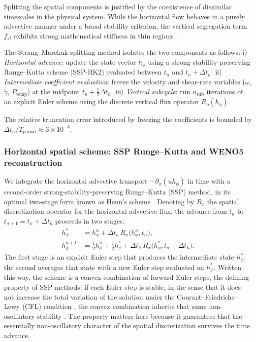 \documentclass[lineno]{JFM-FLM_Au}
\begin{document}
Splitting the spatial components is justified by the coexistence of dissimilar timescales in the physical system. While the horizontal flow behaves in a purely advective manner under a broad stability criterion, the vertical segregation term $f_{sl}$ exhibits strong mathematical stiffness in thin regions \citep{Christov2017}.

The Strang--Marchuk splitting method isolates the two components as follows: i) \textit{Horizontal advance}: update the state vector $h_\phi$ using a strong-stability-preserving Runge--Kutta scheme (SSP-RK2) evaluated between $t_n$ and $t_n+\Delta t_h$. ii) \textit{Intermediate coefficient evaluation}: freeze the velocity and shear-rate variables ($\omega$, $\dot\gamma$, $P_{\mathrm{temp}}$) at the midpoint $t_n + \frac{1}{2}\Delta t_h$. iii) \textit{Vertical subcycle}: run $n_{\mathrm{sub}}$ iterations of an explicit Euler scheme using the discrete vertical flux operator $R_\eta(h_\phi)$.

The relative truncation error introduced by freezing the coefficients is bounded by $\Delta t_h/T_{\mathrm{period}} \approx 3\times10^{-4}$.

\subsubsection{Horizontal spatial scheme: SSP Runge--Kutta and WENO5 reconstruction}
\label{sec:weno5}

We integrate the horizontal advective transport $-\partial_x(u h_\phi)$ in time with a second-order strong-stability-preserving Runge--Kutta (SSP) method, in its optimal two-stage form known as Heun's scheme \citep{ShuOsher1988, GottliebShuTadmor2001}. Denoting by $R_x$ the spatial discretization operator for the horizontal advective flux, the advance from $t_n$ to $t_{n+1}=t_n+\Delta t_h$ proceeds in two stages:
\begin{align}
    h_\phi^{*} &= h_\phi^{n} + \Delta t_h\, R_x\big(h_\phi^{n}, t_n\big), \label{eq:rk_stage1}\\
    h_\phi^{n+1} &= \tfrac{1}{2} h_\phi^{n} + \tfrac{1}{2} h_\phi^{*} + \Delta t_h\, R_x\big(h_\phi^{*}, t_n+\Delta t_h\big). \label{eq:rk_stage2}
\end{align}
The first stage is an explicit Euler step that produces the intermediate state $h_\phi^{*}$; the second averages that state with a new Euler step evaluated on $h_\phi^{*}$. Written this way, the scheme is a convex combination of forward Euler steps, the defining property of SSP methods: if each Euler step is stable, in the sense that it does not increase the total variation of the solution under the Courant--Friedrichs--Lewy (CFL) condition \citep{CourantFriedrichsLewy1928}, the convex combination inherits that same non-oscillatory stability \citep{GottliebShuTadmor2001}. The property matters here because it guarantees that the essentially non-oscillatory character of the spatial discretization survives the time advance.
\end{document}
